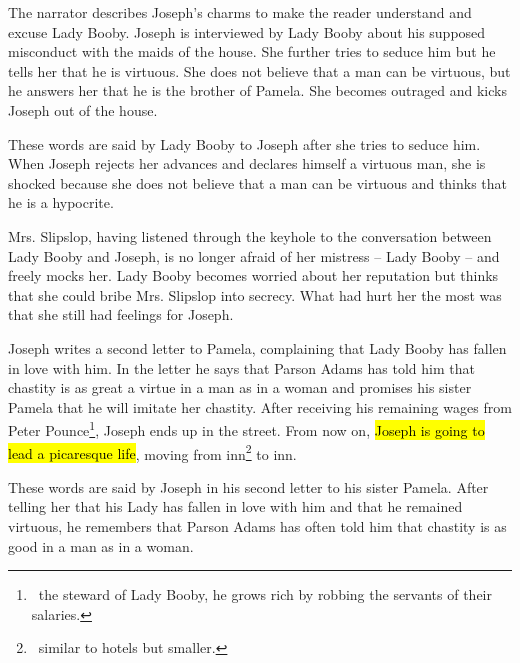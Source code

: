 \documentclass[12pt, a4paper]{article}
\begin{document}

\ind The narrator describes Joseph's charms to make the 
reader understand and excuse Lady Booby. Joseph is interviewed by Lady Booby about his 
supposed misconduct with the maids of the house.
She further tries to seduce him but he tells her that he is virtuous. She does not believe that
a man can be virtuous, but he answers her that he is the brother of Pamela. She becomes outraged and
kicks Joseph out of the house. 



These words are said by Lady Booby to Joseph after she tries to seduce him. When Joseph
rejects her advances and declares himself a virtuous man, she is shocked because
she does not believe that a man can be virtuous and thinks that he is a hypocrite.


\ind Mrs. Slipslop, having listened through the keyhole to the conversation between 
Lady Booby and Joseph, is no longer afraid of her mistress -- Lady Booby -- and freely mocks her.
Lady Booby becomes worried about her reputation but thinks that she could bribe Mrs. Slipslop
into secrecy. What had hurt her the most was that she still had feelings for Joseph. 



\ind Joseph writes a second letter to Pamela, complaining that Lady Booby has fallen in
love with him. In the letter he says that Parson Adams has told him that chastity 
is as great a virtue in a man as in a woman and promises his sister Pamela that he will
imitate her chastity. After receiving his remaining wages from Peter Pounce\footnote{\,
the steward of Lady Booby, he grows rich by robbing the servants of their salaries.}, Joseph ends up in
the street. From now on, \hl{Joseph is going to lead a picaresque life}, moving from inn\footnote{\,
similar to hotels but smaller.} to inn.




These words are said by Joseph in his second letter to his sister Pamela. After telling her
that his Lady has fallen in love with him and that he remained virtuous, he remembers that
Parson Adams has often told him that chastity is as good in a man as in a woman.
\end{document}
